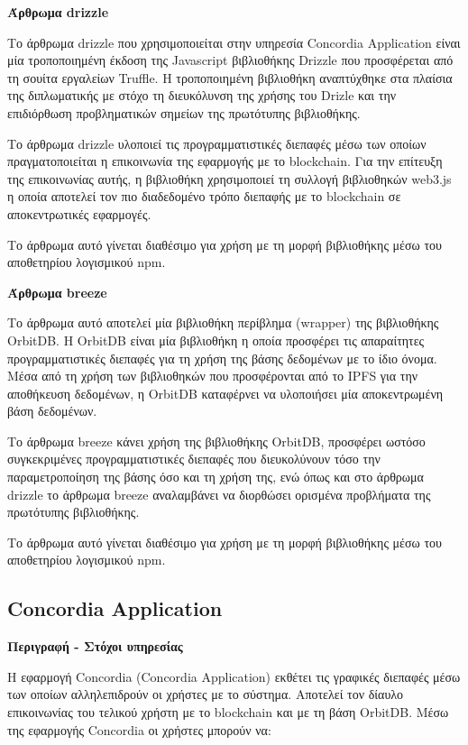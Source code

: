 \vspace{0.5cm}
\textbf{Άρθρωμα drizzle}

Το άρθρωμα drizzle που χρησιμοποιείται στην υπηρεσία Concordia Application είναι μία τροποποιημένη έκδοση της Javascript βιβλιοθήκης Drizzle που προσφέρεται από τη σουίτα εργαλείων Truffle. Η τροποποιημένη βιβλιοθήκη αναπτύχθηκε στα πλαίσια της διπλωματικής με στόχο τη διευκόλυνση της χρήσης του Drizle και την επιδιόρθωση προβληματικών σημείων της πρωτότυπης βιβλιοθήκης.

Το άρθρωμα drizzle υλοποιεί τις προγραμματιστικές διεπαφές μέσω των οποίων πραγματοποιείται η επικοινωνία της εφαρμογής με το blockchain. Για την επίτευξη της επικοινωνίας αυτής, η βιβλιοθήκη χρησιμοποιεί τη συλλογή βιβλιοθηκών web3.js η οποία αποτελεί τον πιο διαδεδομένο τρόπο διεπαφής με το blockchain σε αποκεντρωτικές εφαρμογές.

Το άρθρωμα αυτό γίνεται διαθέσιμο για χρήση με τη μορφή βιβλιοθήκης μέσω του αποθετηρίου λογισμικού npm.

\vspace{0.5cm}
\textbf{Άρθρωμα breeze}

Το άρθρωμα αυτό αποτελεί μία βιβλιοθήκη περίβλημα (wrapper) της βιβλιοθήκης OrbitDB. Η OrbitDB είναι μία βιβλιοθήκη η οποία προσφέρει τις απαραίτητες προγραμματιστικές διεπαφές για τη χρήση της βάσης δεδομένων με το ίδιο όνομα. Μέσα από τη χρήση των βιβλιοθηκών που προσφέρονται από το IPFS για την αποθήκευση δεδομένων, η OrbitDB καταφέρνει να υλοποιήσει μία αποκεντρωμένη βάση δεδομένων.

Το άρθρωμα breeze κάνει χρήση της βιβλιοθήκης OrbitDB, προσφέρει ωστόσο συγκεκριμένες προγραμματιστικές διεπαφές που διευκολύνουν τόσο την παραμετροποίηση της βάσης όσο και τη χρήση της, ενώ όπως και στο άρθρωμα drizzle το άρθρωμα breeze αναλαμβάνει να διορθώσει ορισμένα προβλήματα της πρωτότυπης βιβλιοθήκης.

Το άρθρωμα αυτό γίνεται διαθέσιμο για χρήση με τη μορφή βιβλιοθήκης μέσω του αποθετηρίου λογισμικού npm.

\subsection{Concordia Application} \label{subsection:4-4-concordia-application-service}

\vspace{0.5cm}
\textbf{Περιγραφή - Στόχοι υπηρεσίας}

Η εφαρμογή Concordia (Concordia Application) εκθέτει τις γραφικές διεπαφές μέσω των οποίων αλληλεπιδρούν οι χρήστες με το σύστημα. Αποτελεί τον δίαυλο επικοινωνίας του τελικού χρήστη με το blockchain και με τη βάση OrbitDB. Μέσω της εφαρμογής Concordia οι χρήστες μπορούν να:

